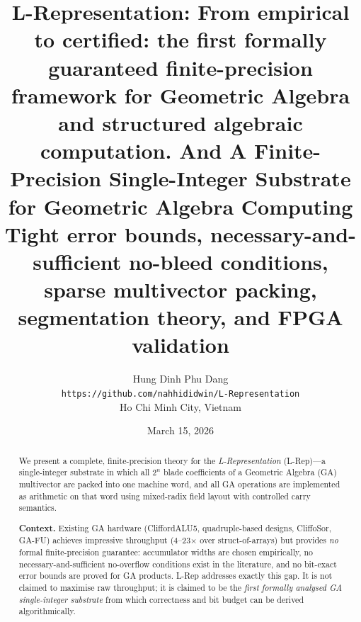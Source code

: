\documentclass[11pt,a4paper]{article}
\title{\textbf{L-Representation: From empirical to certified: the first formally guaranteed finite-precision framework for Geometric Algebra and structured algebraic computation. And A Finite-Precision Single-Integer Substrate\\
for Geometric Algebra Computing}\\[6pt]
\large Tight error bounds, necessary-and-sufficient no-bleed conditions,\\
sparse multivector packing, segmentation theory, and FPGA validation}
\author{Hung Dinh Phu Dang\\
\small \texttt{https://github.com/nahhididwin/L-Representation}\\
\small Ho Chi Minh City, Vietnam}
\date{March 15, 2026}
\theoremstyle{definition}
\theoremstyle{plain}
\theoremstyle{remark}
\begin{document}
\maketitle

\begin{abstract}
We present a complete, finite-precision theory for the
\emph{L-Representation} (L-Rep)---a single-integer substrate in which
all $2^n$ blade coefficients of a Geometric Algebra (GA) multivector
are packed into one machine word, and all GA operations are implemented
as arithmetic on that word using mixed-radix field layout with
controlled carry semantics.

\textbf{Context.}
Existing GA hardware (CliffordALU5, quadruple-based designs, CliffoSor,
GA-FU) achieves impressive throughput (4--23$\times$ over
struct-of-arrays) but provides \emph{no} formal finite-precision
guarantee: accumulator widths are chosen empirically, no necessary-and-sufficient no-overflow conditions exist in the literature, and
no bit-exact error bounds are proved for GA products.
L-Rep addresses exactly this gap.
It is not claimed to maximise raw throughput; it is claimed to be the
\emph{first formally analysed GA single-integer substrate} from which
correctness and bit budget can be derived algorithmically.


\end{abstract}
\end{document}
